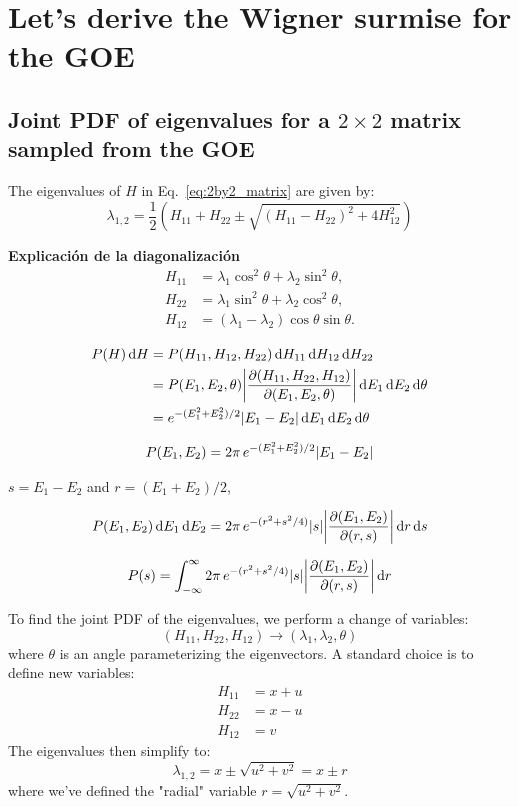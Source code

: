 \documentclass[10pt]{article}
\begin{document}
\section{Let's derive the Wigner surmise for the GOE}
\subsection{Joint PDF of eigenvalues for a $2\times 2$ matrix sampled from the GOE}
The eigenvalues of $H$ in Eq.~\eqref{eq:2by2_matrix} are given by:
$$ \lambda_{1,2} = \frac{1}{2}\left( H_{11} + H_{22} \pm \sqrt{(H_{11} - H_{22})^2 + 4H_{12}^2} \right) $$

\textbf{Explicación de la diagonalización}
\begin{align*}
H_{11} &= \lambda_1 \cos^2\theta + \lambda_2 \sin^2\theta, \\
H_{22} &= \lambda_1 \sin^2\theta + \lambda_2 \cos^2\theta, \\
H_{12} &= (\lambda_1 - \lambda_2) \cos\theta \sin\theta.
\end{align*}

\begin{align*}
P(H) \dd{H} 
&= 
P(H_{11}, H_{12}, H_{22})
\dd{H_{11}}\dd{H_{12}}\dd{H_{22}}
\\
&= 
P(E_1, E_2, \theta)
\abs{\pdv{(H_{11}, H_{22}, H_{12})}{(E_1, E_2, \theta)}}
\dd{E_1}\dd{E_2} \dd{\theta}\\
&= 
e^{-(E_1^2 + E_2^2)/2}
\abs{E_1 - E_2}
\dd{E_1}\dd{E_2} \dd{\theta}
\end{align*}

\begin{align*}
P(E_1, E_2) 
= 
2\pi\,
e^{-(E_1^2 + E_2^2)/2}
\abs{E_1 - E_2}
\end{align*}

$s = E_1 - E_2$ and $r = (E_1 + E_2)/2$, 

\begin{align*}
P(E_1, E_2) 
\dd{E_1} \dd{E_2}
= 
2\pi\,
e^{-(r^2 + s^2/4)}
\abs{s}
\abs{\pdv{(E_1, E_2)}{(r, s)}}
\dd{r} \dd{s}
\end{align*}

\begin{align}
P(s)
= 
\int_{-\infty}^{\infty}
2\pi\,
e^{-(r^2 + s^2/4)}
\abs{s}
\abs{\pdv{(E_1, E_2)}{(r, s)}}
\dd{r}
\end{align}

To find the joint PDF of the eigenvalues, we perform a change of variables:
$$ (H_{11}, H_{22}, H_{12}) \rightarrow (\lambda_1, \lambda_2, \theta) $$
where $\theta$ is an angle parameterizing the eigenvectors. A standard choice is to define new variables:
$$ \begin{aligned}
H_{11} &= x + u \\
H_{22} &= x - u \\
H_{12} &= v
\end{aligned} $$
The eigenvalues then simplify to:
$$ \lambda_{1,2} = x \pm \sqrt{u^2 + v^2} = x \pm r $$
where we've defined the "radial" variable $r = \sqrt{u^2 + v^2}$.
\end{document}
